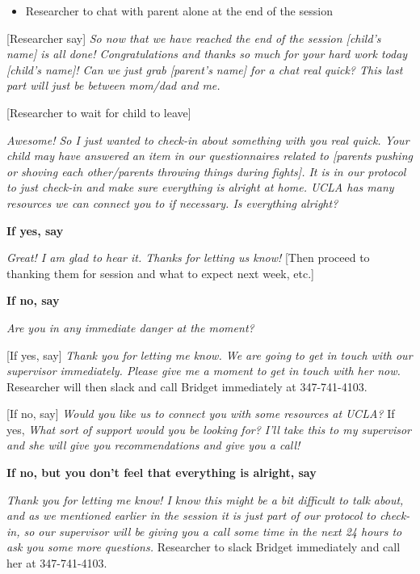 \documentclass[
]{book}
\providecommand{\tightlist}{%
  \setlength{\itemsep}{0pt}\setlength{\parskip}{0pt}}
\begin{document}
\begin{itemize}
\tightlist
\item
  Researcher to chat with parent alone at the end of the session
\end{itemize}

{[}Researcher say{]} \emph{So now that we have reached the end of the session {[}child's name{]} is all done! Congratulations and thanks so much for your hard work today {[}child's name{]}! Can we just grab {[}parent's name{]} for a chat real quick? This last part will just be between mom/dad and me.}

{[}Researcher to wait for child to leave{]}

\emph{Awesome! So I just wanted to check-in about something with you real quick. Your child may have answered an item in our questionnaires related to {[}parents pushing or shoving each other/parents throwing things during fights{]}. It is in our protocol to just check-in and make sure everything is alright at home. UCLA has many resources we can connect you to if necessary. Is everything alright?}

\textbf{If yes, say}

\emph{Great! I am glad to hear it. Thanks for letting us know!} {[}Then proceed to thanking them for session and what to expect next week, etc.{]}

\textbf{If no, say}

\emph{Are you in any immediate danger at the moment?}

{[}If yes, say{]} \emph{Thank you for letting me know. We are going to get in touch with our supervisor immediately. Please give me a moment to get in touch with her now.} Researcher will then slack and call Bridget immediately at 347-741-4103.

{[}If no, say{]} \emph{Would you like us to connect you with some resources at UCLA?} If yes, \emph{What sort of support would you be looking for? I'll take this to my supervisor and she will give you recommendations and give you a call!}

\textbf{If no, but you don't feel that everything is alright, say}

\emph{Thank you for letting me know! I know this might be a bit difficult to talk about, and as we mentioned earlier in the session it is just part of our protocol to check-in, so our supervisor will be giving you a call some time in the next 24 hours to ask you some more questions.} Researcher to slack Bridget immediately and call her at 347-741-4103.
\end{document}
